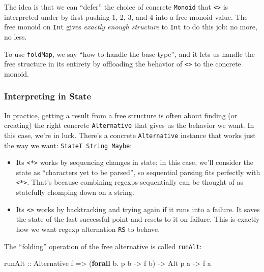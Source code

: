 \documentclass[]{article}
\newenvironment{Shaded}{}{}
\newcommand{\DataTypeTok}[1]{\textcolor[rgb]{0.56,0.13,0.00}{#1}}
\newcommand{\KeywordTok}[1]{\textcolor[rgb]{0.00,0.44,0.13}{\textbf{#1}}}
\newcommand{\NormalTok}[1]{#1}
\newcommand{\OperatorTok}[1]{\textcolor[rgb]{0.40,0.40,0.40}{#1}}
\newcommand{\OtherTok}[1]{\textcolor[rgb]{0.00,0.44,0.13}{#1}}
\begin{document}
The idea is that we can ``defer'' the choice of concrete \texttt{Monoid} that
\texttt{\textless{}\textgreater{}} is interpreted under by first pushing 1, 2,
3, and 4 into a free monoid value. The free monoid on \texttt{Int} gives
\emph{exactly enough structure} to \texttt{Int} to do this job: no more, no
less.

To use \texttt{foldMap}, we say ``how to handle the base type'', and it lets us
handle the free structure in its entirety by offloading the behavior of
\texttt{\textless{}\textgreater{}} to the concrete monoid.

\hypertarget{interpreting-in-state}{%
\subsubsection{Interpreting in State}\label{interpreting-in-state}}

In practice, getting a result from a free structure is often about finding (or
creating) the right concrete \texttt{Alternative} that gives us the behavior we
want. In this case, we're in luck. There's a concrete \texttt{Alternative}
instance that works just the way we want: \texttt{StateT\ String\ Maybe}:

\begin{itemize}
\tightlist
\item
  Its \texttt{\textless{}*\textgreater{}} works by sequencing changes in state;
  in this case, we'll consider the state as ``characters yet to be parsed'', so
  sequential parsing fits perfectly with \texttt{\textless{}*\textgreater{}}.
  That's because combining regexps sequentially can be thought of as statefully
  chomping down on a string.
\item
  Its \texttt{\textless{}\textbar{}\textgreater{}} works by backtracking and
  trying again if it runs into a failure. It saves the state of the last
  successful point and resets to it on failure. This is exactly how we want
  regexp alternation \texttt{R\textbar{}S} to behave.
\end{itemize}

The ``folding'' operation of the free alternative is called \texttt{runAlt}:

\begin{Shaded}
\begin{Highlighting}[]
\OtherTok{runAlt ::} \DataTypeTok{Alternative}\NormalTok{ f}
       \OtherTok{=>}\NormalTok{ (}\KeywordTok{forall}\NormalTok{ b}\OperatorTok{.}\NormalTok{ p b }\OtherTok{{-}>}\NormalTok{ f b)}
       \OtherTok{{-}>} \DataTypeTok{Alt}\NormalTok{ p a}
       \OtherTok{{-}>}\NormalTok{ f a}
\end{Highlighting}
\end{Shaded}
\end{document}
